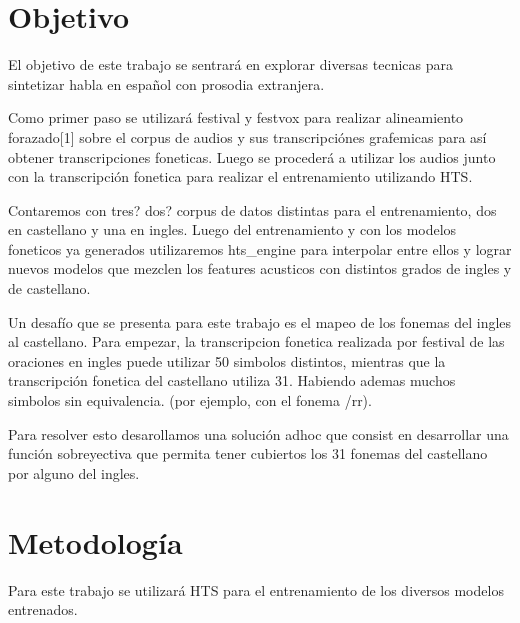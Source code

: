 \section{Objetivo}

El objetivo de este trabajo se sentrará en explorar diversas tecnicas para sintetizar habla en español con prosodia extranjera. 


Como primer paso se utilizará festival y festvox para realizar alineamiento forazado[1] sobre el corpus de audios y sus transcripciónes grafemicas para así obtener transcripciones foneticas. Luego se procederá a utilizar los audios junto con la transcripción fonetica para realizar el entrenamiento utilizando HTS.

Contaremos con tres? dos? corpus de datos distintas para el entrenamiento, dos en castellano y una en ingles. Luego del entrenamiento y con los modelos foneticos ya generados utilizaremos hts_engine para interpolar entre ellos y lograr nuevos modelos que mezclen los features acusticos con distintos grados de ingles y de castellano.

Un desafío que se presenta para este trabajo es el mapeo de los fonemas del ingles al castellano. Para empezar, la transcripcion fonetica realizada por festival de las oraciones en ingles puede utilizar 50 simbolos distintos, mientras que la transcripción fonetica del castellano utiliza 31. Habiendo ademas muchos simbolos sin equivalencia. (por ejemplo, con el fonema /rr).

Para resolver esto desarollamos una solución adhoc que consist en desarrollar una función sobreyectiva que permita tener cubiertos los 31 fonemas del castellano por alguno del ingles.



\section{Metodología}

Para este trabajo se utilizará HTS para el entrenamiento de los diversos modelos entrenados.
